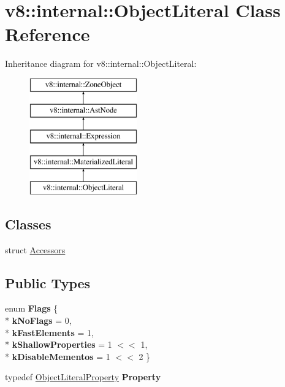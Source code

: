 \hypertarget{classv8_1_1internal_1_1_object_literal}{}\section{v8\+:\+:internal\+:\+:Object\+Literal Class Reference}
\label{classv8_1_1internal_1_1_object_literal}
Inheritance diagram for v8\+:\+:internal\+:\+:Object\+Literal\+:\begin{figure}[H]
\begin{center}
\leavevmode
\includegraphics[height=5.000000cm]{classv8_1_1internal_1_1_object_literal}
\end{center}
\end{figure}
\subsection*{Classes}
\begin{DoxyCompactItemize}
\item 
struct \hyperlink{structv8_1_1internal_1_1_object_literal_1_1_accessors}{Accessors}
\end{DoxyCompactItemize}
\subsection*{Public Types}
\begin{DoxyCompactItemize}
\item 
enum {\bfseries Flags} \{ \\*
{\bfseries k\+No\+Flags} = 0, 
\\*
{\bfseries k\+Fast\+Elements} = 1, 
\\*
{\bfseries k\+Shallow\+Properties} = 1 $<$$<$ 1, 
\\*
{\bfseries k\+Disable\+Mementos} = 1 $<$$<$ 2
 \}\hypertarget{classv8_1_1internal_1_1_object_literal_a2d3487eb42d6a0174042c3656f6500b3}{}\label{classv8_1_1internal_1_1_object_literal_a2d3487eb42d6a0174042c3656f6500b3}

\item 
typedef \hyperlink{classv8_1_1internal_1_1_object_literal_property}{Object\+Literal\+Property} {\bfseries Property}\hypertarget{classv8_1_1internal_1_1_object_literal_a0c439cc7369713975ac1ea37bf7b0502}{}\label{classv8_1_1internal_1_1_object_literal_a0c439cc7369713975ac1ea37bf7b0502}

\end{DoxyCompactItemize}
